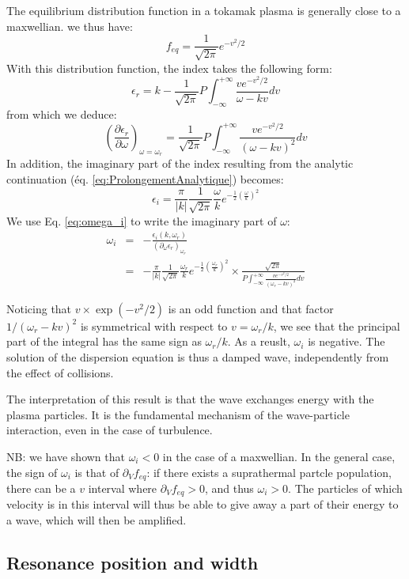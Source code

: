 The equilibrium distribution function in a tokamak plasma is generally close to a maxwellian. we thus have:
\[
		f_{eq} = \frac{1}{\sqrt{2\pi}} e^{-v^2/2}
\]
With this distribution function, the index takes the following form:
\[
		\epsilon_r = k- \frac{1}{\sqrt{2\pi}} P \int_{-\infty}^{+\infty}\frac{v e^{-v^2/2}}{\omega-kv} dv
\]
from which we deduce:
\[
		\left( \frac{\partial \epsilon_r}{\partial \omega} \right)_{\omega=\omega_r} = \frac{1}{\sqrt{2\pi}}P \int_{-\infty}^{+\infty}\frac{v e^{-v^2/2}}{(\omega-kv)^2} dv
\]
In addition, the imaginary part of the index resulting from the analytic continuation (éq. \ref{eq:ProlongementAnalytique}) becomes:
\[
		\epsilon_i = \frac{\pi}{|k|}\frac{1}{\sqrt{2\pi}}\frac{\omega}{k} e^{-\frac{1}{2}\left( \frac{\omega}{k} \right)^2}
\]
We use Eq. \ref{eq:omega_i} to write the imaginary part of $\omega$:
\begin{eqnarray*}
		\omega_i  &  =  &   - \frac{\epsilon_i(k,\omega_r)}{(\partial_\omega \epsilon_r)_{\omega_r}}  \\
							&	 =  &	  - \frac{\pi}{|k|}\frac{1}{\sqrt{2\pi}}\frac{\omega_r}{k}e^{-\frac{1}{2}\left( \frac{\omega_r}{k} \right)^2} \times \frac{\sqrt{2\pi}}{P \int_{-\infty}^{+\infty} \frac{v e^{-v^2/2}}{(\omega_r-kv)^2} dv}
\end{eqnarray*}

Noticing that $v\times\exp(-v^2/2)$ is an odd function and that factor $1/(\omega_r-kv)^2$ is symmetrical with respect to $v = \omega_r/k$, we see that the principal part of the integral has the same sign as $\omega_r/k$. As a reuslt, $\omega_i$ is negative. The solution of the dispersion equation is thus a damped wave, independently from the effect of collisions.

The interpretation of this result is that the wave exchanges energy with the plasma particles. It is the fundamental mechanism of the wave-particle interaction, even in the case of turbulence.

NB: we have shown that $\omega_i <0$ in the case of a maxwellian. In the general case, the sign of  $\omega_i$ is that of $\partial_V f_{eq}$: if there exists a suprathermal partcle population, there can be a $v$ interval where $\partial_V f_{eq} > 0$, and thus $\omega_i >0$. The particles of which velocity is in this interval will thus be able to give away a part of their energy to a wave, which will then be amplified.


				\subsection{Resonance position and width}
				\label{sub:PositionEtLargeurDesResonances}

